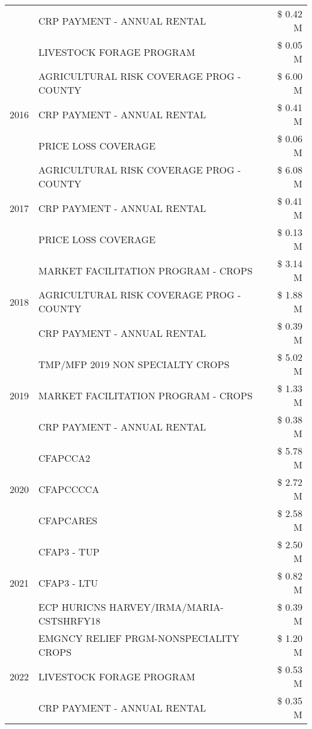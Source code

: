 \begin{tabular}{llr}
 & CRP PAYMENT - ANNUAL RENTAL & \$ 0.42 M \\
 & LIVESTOCK FORAGE PROGRAM & \$ 0.05 M \\
\cline{1-3}
\multirow[t]{3}{*}{2016} & AGRICULTURAL RISK COVERAGE PROG - COUNTY & \$ 6.00 M \\
 & CRP PAYMENT - ANNUAL RENTAL & \$ 0.41 M \\
 & PRICE LOSS COVERAGE & \$ 0.06 M \\
\cline{1-3}
\multirow[t]{3}{*}{2017} & AGRICULTURAL RISK COVERAGE PROG - COUNTY & \$ 6.08 M \\
 & CRP PAYMENT - ANNUAL RENTAL & \$ 0.41 M \\
 & PRICE LOSS COVERAGE & \$ 0.13 M \\
\cline{1-3}
\multirow[t]{3}{*}{2018} & MARKET FACILITATION PROGRAM - CROPS & \$ 3.14 M \\
 & AGRICULTURAL RISK COVERAGE PROG - COUNTY & \$ 1.88 M \\
 & CRP PAYMENT - ANNUAL RENTAL & \$ 0.39 M \\
\cline{1-3}
\multirow[t]{3}{*}{2019} & TMP/MFP 2019 NON SPECIALTY CROPS & \$ 5.02 M \\
 & MARKET FACILITATION PROGRAM - CROPS & \$ 1.33 M \\
 & CRP PAYMENT - ANNUAL RENTAL & \$ 0.38 M \\
\cline{1-3}
\multirow[t]{3}{*}{2020} & CFAPCCA2 & \$ 5.78 M \\
 & CFAPCCCCA & \$ 2.72 M \\
 & CFAPCARES & \$ 2.58 M \\
\cline{1-3}
\multirow[t]{3}{*}{2021} & CFAP3 - TUP & \$ 2.50 M \\
 & CFAP3 - LTU & \$ 0.82 M \\
 & ECP HURICNS HARVEY/IRMA/MARIA-CSTSHRFY18 & \$ 0.39 M \\
\cline{1-3}
\multirow[t]{3}{*}{2022} & EMGNCY RELIEF PRGM-NONSPECIALITY CROPS & \$ 1.20 M \\
 & LIVESTOCK FORAGE PROGRAM & \$ 0.53 M \\
 & CRP PAYMENT - ANNUAL RENTAL & \$ 0.35 M \\
\cline{1-3}
\bottomrule
\end{tabular}
